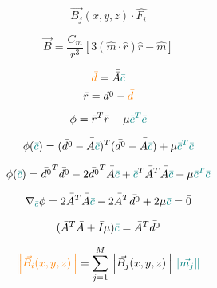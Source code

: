 \begin{equation}
    \vec{B_j}(x, y, z) \cdot \hat{F_i}
\end{equation}

\begin{equation}
    \vec{B} = \frac{C_m}{r^3} [3 ( \hat{m} \cdot \hat{r}) \hat{r} - \hat{m}]
\end{equation}

\begin{equation}
    \textcolor{orange}{\Bar{d}} = \Bar{\Bar{A}} \textcolor{teal}{\Bar{c}}
\end{equation}
\begin{equation}
    \bar{r} = \bar{d^0} - \textcolor{orange}{\bar{d}}
\end{equation}

\begin{equation}
    \phi = \bar{r}^T\bar{r} + \mu \textcolor{teal}{\bar{c}^T\bar{c}}
\end{equation}

\begin{equation}
    \phi (\textcolor{teal}{\bar{c}}) = (\bar{d^0} - \Bar{\Bar{A}} \textcolor{teal}{\Bar{c}})^T (\bar{d^0} - \Bar{\Bar{A}} \textcolor{teal}{\Bar{c}}) + \mu \textcolor{teal}{\bar{c}^T\bar{c}}
\end{equation}

\begin{equation}
    \phi (\textcolor{teal}{\bar{c}}) = \bar{d^0}^T\bar{d^0} - 2 \bar{d^0}^T \Bar{\Bar{A}} \textcolor{teal}{\Bar{c}} + \textcolor{teal}{\Bar{c}}^T \Bar{\Bar{A}}^T \Bar{\Bar{A}} \textcolor{teal}{\Bar{c}} + \mu \textcolor{teal}{\bar{c}^T\bar{c}}
\end{equation}

\begin{equation}
    \nabla_{\textcolor{teal}{\bar{c}}} \phi = 2 \Bar{\Bar{A}}^T \Bar{\Bar{A}} \textcolor{teal}{\Bar{c}} - 2\Bar{\Bar{A}}^T\bar{d^0} + 2\mu \textcolor{teal}{\bar{c}} = \bar{0}
\end{equation}
    
\begin{equation}
    (\Bar{\Bar{A}}^T \Bar{\Bar{A}} + \Bar{\Bar{I}} \mu ) \textcolor{teal}{\bar{c}} = 
    \Bar{\Bar{A}}^T\bar{d^0}
\end{equation}

\begin{equation}
  \textcolor{orange}{\left\lVert \vec{B_i}(x,y,z) \right\rVert} = \sum_{j=1}^{M} \left\lVert \vec{B_j}(x,y,z) \right\rVert \textcolor{teal}{\left\lVert \vec{m_j} \right\rVert}
\end{equation}


